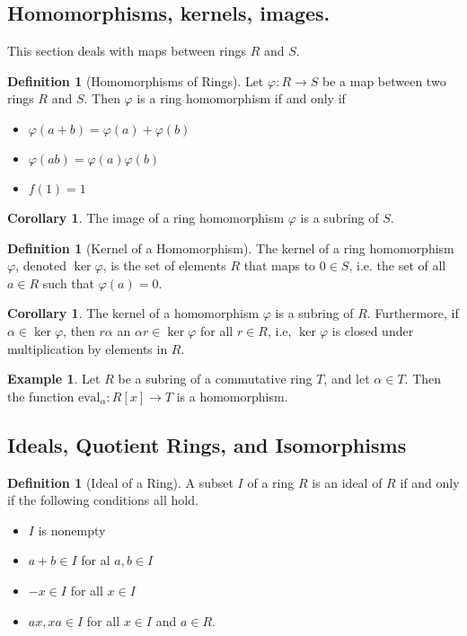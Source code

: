 \documentclass[10pt, oneside, reqno]{amsart}
\theoremstyle{plain}%
\theoremstyle{definition}
\newtheorem{defn}[thm]{Definition}
\newtheorem{exmp}[thm]{Example}
\newtheorem{cor}[thm]{Corollary}
\theoremstyle{remark}
\newcommand{\al}{\alpha}
\begin{document}
\subsection{Homomorphisms, kernels, images.} %
\label{sub:homomorphisms_kernels_images_}
This section deals with maps between rings $R$ and $S$.

\begin{defn}[Homomorphisms of Rings]
	Let $\varphi: R \rightarrow S$ be a map between two rings $R$ and $S$.  Then $\varphi$ is a ring homomorphism if and only if
	\begin{itemize}
		\item $\varphi(a + b) = \varphi(a) + \varphi(b)$
		\item $\varphi(ab) = \varphi(a) \varphi(b)$
		\item $f(1) = 1$
	\end{itemize}
\end{defn}

\begin{cor}
	The image of a ring homomorphism $\varphi$ is a subring of $S$.
\end{cor}
\begin{defn}[Kernel of a Homomorphism]
	The kernel of a ring homomorphism $\varphi$, denoted $\ker \varphi$, is the set of elements $R$ that maps to $0 \in S$, i.e. the set of all $a \in R$ such that $\varphi(a) = 0$.
\end{defn}

\begin{cor}
	The kernel of a homomorphism $\varphi$ is a subring of $R$.  Furthermore, if $\al \in \ker \varphi$, then $r \al$ an $\al r \in \ker \varphi$ for all $r \in R$, i.e, $\ker \varphi$ is closed under multiplication by elements in $R$. 
\end{cor}

\begin{exmp}
	Let $R$ be a subring of a commutative ring $T$, and let $\al \in T$.  Then the function $\text{eval}_\alpha : R[x] \rightarrow T$ is a homomorphism.
\end{exmp}



\subsection{Ideals, Quotient Rings, and Isomorphisms} %
\label{sub:ideals_quotient_rings_and_isomorphisms}


\begin{defn}[Ideal of a Ring]
	A subset $I$ of a ring $R$ is an ideal of $R$ if and only if the following conditions all hold.
	\begin{itemize}
		\item $I$ is nonempty
		\item $a + b \in I$ for al $a, b \in I$
		\item $-x \in I$ for all $x \in I$
		\item $ax, xa \in I$ for all $x \in I$ and $a \in R$.
	\end{itemize}
\end{defn}
\end{document}
